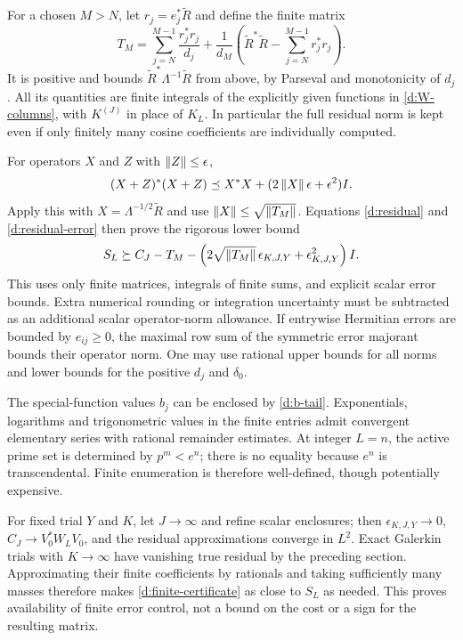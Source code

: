 For a chosen $M>N$, let $r_j=e_j^*\widetilde R$ and define the finite
matrix
\begin{equation}\label{d:weighted-tail}
T_M=\sum_{j=N}^{M-1}\frac{r_j^*r_j}{d_j}
+\frac1{d_M}\left(\widetilde R^*\widetilde R-
\sum_{j=N}^{M-1}r_j^*r_j\right).
\end{equation}
It is positive and bounds $\widetilde R^*\Lambda^{-1}\widetilde R$ from
above, by Parseval and monotonicity of $d_j$. All its quantities are finite
integrals of the explicitly given functions in \eqref{d:W-columns}, with
$K^{(J)}$ in place of $K_L$. In particular the full residual norm is kept
even if only finitely many cosine coefficients are individually computed.

For operators $X$ and $Z$ with $\left\lVert Z\right\rVert\le\epsilon$,
\[
(X+Z)^*(X+Z)\preceq X^*X+(2\left\lVert X\right\rVert\epsilon+\epsilon^2)I.
\]
Apply this with $X=\Lambda^{-1/2}\widetilde R$ and use
$\left\lVert X\right\rVert\le\sqrt{\left\lVert T_M\right\rVert}$. Equations \eqref{d:residual} and
\eqref{d:residual-error} then prove the rigorous lower bound
\begin{equation}\label{d:finite-certificate}
S_L\succeq C_J-T_M-
\left(2\sqrt{\left\lVert T_M\right\rVert}\,\epsilon_{K,J,Y}
+\epsilon_{K,J,Y}^2\right)I.
\end{equation}
This uses only finite matrices, integrals of finite sums, and explicit
scalar error bounds. Extra numerical rounding or integration uncertainty
must be subtracted as an additional scalar operator-norm allowance.
If entrywise Hermitian errors are bounded by $e_{ij}\ge0$, the maximal
row sum of the symmetric error majorant bounds their operator norm.
One may use rational upper bounds for all norms and lower bounds for
the positive $d_j$ and $\delta_0$.

The special-function values $b_j$ can be enclosed by \eqref{d:b-tail}.
Exponentials, logarithms and trigonometric values in the finite entries
admit convergent elementary series with rational remainder estimates.
At integer $L=n$, the active prime set is determined by $p^m<e^n$;
there is no equality because $e^n$ is transcendental. Finite enumeration
is therefore well-defined, though potentially expensive.

For fixed trial $Y$ and $K$, let $J\to\infty$ and refine scalar enclosures;
then $\epsilon_{K,J,Y}\to0$, $C_J\to V_0^*W_LV_0$, and the residual
approximations converge in $L^2$. Exact Galerkin trials with $K\to\infty$
have vanishing true residual by the preceding section. Approximating their
finite coefficients by rationals and taking sufficiently many masses
therefore makes \eqref{d:finite-certificate} as close to $S_L$ as needed.
This proves availability of finite error control, not a bound on the cost
or a sign for the resulting matrix.


